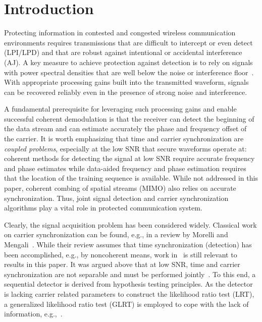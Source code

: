\section{Introduction}%
\label{sec:introduction}


Protecting information in contested and congested wireless
communication environments requires transmissions that are difficult
to intercept or even detect (LPI/LPD) and that are robust against
intentional or accidental interference (AJ).
A key measure to achieve protection against detection is to rely on
signals with power spectral densities that are well below the noise or
interference floor~\cite{Yan_19}.
With appropriate processing gains built into the transmitted waveform, signals can be
recovered reliably even in the presence of strong noise and
interference.

A fundamental prerequisite for leveraging such processing gains and
enable successful coherent demodulation is that the receiver can
detect the beginning of the data stream and
can estimate accurately the phase and frequency offset of the carrier.
It is worth emphasizing that time and carrier synchronization are
\emph{coupled problems}, especially at the low SNR that secure
waveforms operate at:
coherent methods for detecting the signal at low SNR require accurate frequency and phase estimates 
while data-aided frequency and phase estimation requires that the
location of the training sequence is available.
While not addressed in this paper, coherent combing of
spatial streams (MIMO) also relies on accurate synchronization.
Thus, joint signal detection and carrier synchronization algorithms
play a vital role in protected communication system.

Clearly, the signal acquisition problem has been considered widely. 
Classical work on carrier synchronization can be found, e.g., in a
review by  Morelli
and Mengali~\cite{Morelli_Mengali_98}. 
While their review assumes that time synchronization (detection) has been
accomplished, e.g., by noncoherent means, 
work in~\cite{kay_89,Fitz_94,Luise_Reggiannini_95}
is still relevant to results in this paper.
It was argued above that at low SNR, time and carrier synchronization
are not separable and must be performed jointly~\cite{purushothaman_16,kim_17}.
To this end, 
a sequential detector is derived from hypothesis testing principles.
As the detector is lacking carrier related parameters to construct 
the likelihood ratio test (LRT), a generalized likelihood ratio test (GLRT)
is employed to cope with the lack of information, e.g.,~\cite{liang_15}.

